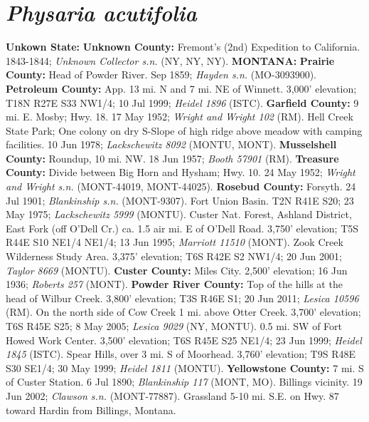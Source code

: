 \section*{\textit{Physaria acutifolia}}

  \textbf{Unkown State:}
  \textbf{Unknown County:}
Fremont's (2nd) Expedition to California. 1843-1844;
\textit{Unknown Collector s.n.} (NY, NY, NY).
  \textbf{MONTANA:}
  \textbf{Prairie County:}
Head of Powder River. Sep 1859; \textit{Hayden s.n.} (MO-3093900).
  \textbf{Petroleum County:}
App. 13 mi. N and 7 mi. NE of Winnett. 3,000' elevation; T18N R27E S33 NW1/4;
10 Jul 1999; \textit{Heidel 1896} (ISTC).
  \textbf{Garfield County:}
9 mi. E. Mosby; Hwy. 18. 17 May 1952; \textit{Wright and Wright 102} (RM).
Hell Creek State Park; One colony on dry S-Slope of high ridge above meadow
with camping facilities. 10 Jun 1978;
\textit{Lackschewitz 8092} (MONTU, MONT).
  \textbf{Musselshell County:}
Roundup, 10 mi. NW. 18 Jun 1957; \textit{Booth 57901} (RM).
  \textbf{Treasure County:}
Divide between Big Horn and Hysham; Hwy. 10. 24 May 1952;
\textit{Wright and Wright s.n.} (MONT-44019, MONT-44025).
  \textbf{Rosebud County:}
Forsyth. 24 Jul 1901; \textit{Blankinship s.n.} (MONT-9307).
Fort Union Basin. T2N R41E S20; 23 May 1975; \textit{Lackschewitz 5999} (MONTU).
Custer Nat. Forest, Ashland District, East Fork (off O'Dell Cr.) ca. 1.5 air mi.
E of O'Dell Road. 3,750' elevation; T5S R44E S10 NE1/4 NE1/4; 13 Jun 1995;
\textit{Marriott 11510} (MONT).
Zook Creek Wilderness Study Area. 3,375' elevation; T6S R42E S2 NW1/4;
20 Jun 2001; \textit{Taylor 8669} (MONTU).
  \textbf{Custer County:}
Miles City. 2,500' elevation; 16 Jun 1936; \textit{Roberts 257} (MONT).
  \textbf{Powder River County:}
Top of the hills at the head of Wilbur Creek. 3,800' elevation; T3S R46E S1;
20 Jun 2011; \textit{Lesica 10596} (RM).
On the north side of Cow Creek 1 mi. above Otter Creek. 3,700' elevation;
T6S R45E S25; 8 May 2005; \textit{Lesica 9029} (NY, MONTU).
0.5 mi. SW of Fort Howed Work Center. 3,500' elevation; T6S R45E S25 NE1/4;
23 Jun 1999; \textit{Heidel 1845} (ISTC).
Spear Hills, over 3 mi. S of Moorhead. 3,760' elevation; T9S R48E S30 SE1/4;
30 May 1999; \textit{Heidel 1811} (MONTU).
  \textbf{Yellowstone County:}
7 mi. S of Custer Station. 6 Jul 1890; \textit{Blankinship 117} (MONT, MO).
Billings vicinity. 19 Jun 2002; \textit{Clawson s.n.} (MONT-77887).
Grassland 5-10 mi. S.E. on Hwy. 87 toward Hardin from Billings, Montana.
